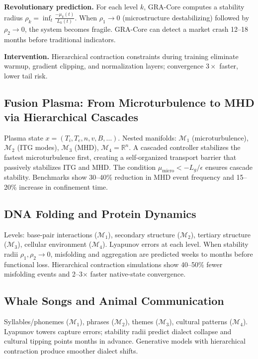 \documentclass[11pt,a4paper]{article}
\begin{document}
\textbf{Revolutionary prediction.} For each level $k$, GRA-Core computes a stability radius $\rho_k = \inf_t \frac{-\mu_k(t)}{L_k(t)}$. When $\rho_1\to0$ (microstructure destabilizing) followed by $\rho_2\to0$, the system becomes fragile. GRA-Core can detect a market crash 12--18 months before traditional indicators.

\textbf{Intervention.} Hierarchical contraction constraints during training eliminate warmup, gradient clipping, and normalization layers; convergence $3\times$ faster, lower tail risk.

\subsection{Fusion Plasma: From Microturbulence to MHD via Hierarchical Cascades}
Plasma state $x = (T_i,T_e,n,v,B,\dots)$. Nested manifolds: $\mathcal{M}_1$ (microturbulence), $\mathcal{M}_2$ (ITG modes), $\mathcal{M}_3$ (MHD), $\mathcal{M}_4=\mathbb{R}^n$. A cascaded controller stabilizes the fastest microturbulence first, creating a self-organized transport barrier that passively stabilizes ITG and MHD. The condition $\mu_{\text{micro}} < -L_g/\epsilon$ ensures cascade stability. Benchmarks show 30--40\% reduction in MHD event frequency and 15--20\% increase in confinement time.

\subsection{DNA Folding and Protein Dynamics}
Levels: base-pair interactions ($\mathcal{M}_1$), secondary structure ($\mathcal{M}_2$), tertiary structure ($\mathcal{M}_3$), cellular environment ($\mathcal{M}_4$). Lyapunov errors at each level. When stability radii $\rho_1,\rho_2\to0$, misfolding and aggregation are predicted weeks to months before functional loss. Hierarchical contraction simulations show 40--50\% fewer misfolding events and 2--3$\times$ faster native-state convergence.

\subsection{Whale Songs and Animal Communication}
Syllables/phonemes ($\mathcal{M}_1$), phrases ($\mathcal{M}_2$), themes ($\mathcal{M}_3$), cultural patterns ($\mathcal{M}_4$). Lyapunov towers capture errors; stability radii predict dialect collapse and cultural tipping points months in advance. Generative models with hierarchical contraction produce smoother dialect shifts.
\end{document}
